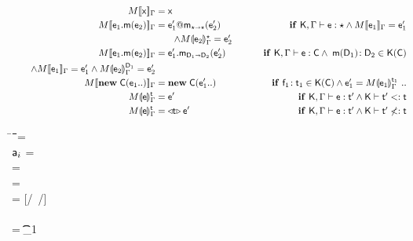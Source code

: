 \documentclass[sigconf]{acmart}
\begin{document}
\begin{figure*}[!h]
\begin{mathpar}


\end{mathpar}

\begin{minipage}{0.32\textwidth}
\begin{align*}
\TRG[M]{\x}\Env &= \x & \\
\TRG[M]{\Call{\e_1}\m{{\e_2}}}\Env &= \DynCall{\ep_1}\m{\ep_2} & \tag*{\IF\EM{\TypeCk{\K,\Env}\e\any
\AND \TRG[M]{\e_1}\Env = \ep_1}} \\ &\tag*{\EM{\wedge \TAG[M]{\e_2}\Env{\any} = \ep_2}}\\
\TRG[M]{\Call{\e_1}\m{{\e_2}}}\Env &= \KCall{\ep_1}\m{\ep_2}{\D[1]}{\D[2]} & \tag*{\IF\EM{\TypeCk{\K,\Env}\e\C
\AND\; \Mtype\m{\D[1]}{\D[2]}\In\App\K\C}}\\
\tag*{\EM{\AND \TRG[M]{\e_1}\Env = \ep_1 \wedge \TAG[M]{\e_2}\Env{\D[1]} = \ep_2}}\\
\TRG[M]{\New\C{{\e_1}..}}\Env &= \New\C{\ep_1..} & \tag*{\IF\EM{\Ftype{\f[1]}{\t[1]}\In\App\K\C
    \AND \ep[1] = \TAG[M]{\e[1]}\Env{\t[1]} ~..}}\\
\TAG[M]{\e}{\Env}\t &= \e' & \tag*{\IF\EM{\TypeCk{\K,\Env}\e\tp \AND \K\vdash\tp\Sub\t}}\\
\TAG[M]{\e}{\Env}\t &= \MonCast{\t}{\ep} & \tag*{\IF\EM{\TypeCk{\K,\Env}\e\tp \AND \K\vdash\tp\not\Sub\t}}
\end{align*}
\end{minipage}\hspace{1cm}
\begin{minipage}{0.45\textwidth}
\begin{tabbing}
  \K\HS \New{} \HS\= \s~\HS \=\Red\HS \= \K \HS\= \ap \HS\= \sp\HS \= \WHERE\HS\= \fresh\ap \HS\HS\HS\HS\HS\HS\HS\=  \sp = {\Map{}}
\\
\K\HS \FReadR\a{\f[i]} \> \s           \>\Red\>     \K \>$\a[i]$ \> \s  \> \WHERE \>\App\s\a=\obj{}
\\
\K\HS {\FWriteR\a{\f[i]}\ap} \> \s     \>\Red\>     \K \> \ap \> \sp \>  \WHERE \>\App\s\a=\obj{} \HS  
\\ \> \> \> \> \> \> \> \sp = \Map{}
\\
\K\HS{\KCall\a\m\ap\t\tp} \> \s      \>\Red\>     \K \>  \ep \> \s \> \WHERE\> \ep = {[\a/\this~{\ap/\x}]\e} \HS \\ \> \> \> \> \> \> \> \Mdef\m{}\e\In \App\K\C  \\ \> \> \> \> \> \> \>  \App\s\a=\obj{} \> \StrSub {\emptyset}\K\t {\t_{1}} \\ 

\end{tabbing}
\end{minipage}
\end{figure*}
\end{document}

